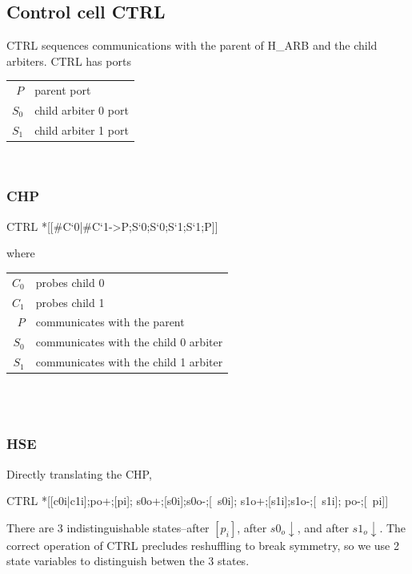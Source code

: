 \documentclass{article}
\begin{document}
\subsection{Control cell CTRL}
CTRL sequences communications with the parent of H\_ARB and the child arbiters.
CTRL has ports

\begin{tabular}[]{rl}
$P$ & parent port \\
$S_0$ & child arbiter 0 port \\
$S_1$ & child arbiter 1 port \\
\end{tabular} \\

\subsubsection*{CHP}

\begin{csp}
CTRL\equiv
  *[[#{C`0}|#{C`1}->P;S`0;S`0;S`1;S`1;P]]
\end{csp}

\noindent where 

\begin{tabular}[]{rl}
  $C_0$ & probes child 0 \\
  $C_1$ & probes child 1 \\
  $P$ & communicates with the parent \\
  $S_0$ & communicates with the child 0 arbiter \\
  $S_1$ & communicates with the child 1 arbiter \\
\end{tabular} \\ \\

\subsubsection*{HSE}

\noindent Directly translating the CHP,

\begin{hse}
CTRL\equiv
  *[[c0i|c1i];po+;[pi];
    s0o+;[s0i];s0o-;[~s0i];
    s1o+;[s1i];s1o-;[~s1i];
    po-;[~pi]]
\end{hse}

\noindent There are 3 indistinguishable states--after $[p_i]$, after $s0_o\!\downarrow$, and after $s1_o\!\downarrow$. The correct operation of CTRL precludes reshuffling to break symmetry, so we use 2 state variables to distinguish betwen the 3 states.
\end{document}
